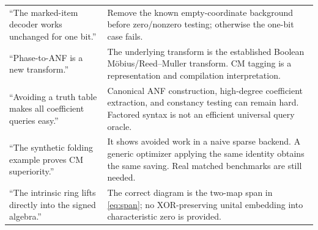 \documentclass[11pt,a4paper]{article}
\theoremstyle{definition}\newtheorem{definition}[theorem]{Definition}
\theoremstyle{remark}\newtheorem{remark}[theorem]{Remark}
\numberwithin{equation}{section}
\begin{document}
\begin{longtable}{@{}L{0.31\textwidth}L{0.63\textwidth}@{}}
``The marked-item decoder works unchanged for one bit.'' & Remove the known empty-coordinate background before zero/nonzero testing; otherwise the one-bit case fails.\\
``Phase-to-ANF is a new transform.'' & The underlying transform is the established Boolean M\"obius/Reed--Muller transform. CM tagging is a representation and compilation interpretation.\\
``Avoiding a truth table makes all coefficient queries easy.'' & Canonical ANF construction, high-degree coefficient extraction, and constancy testing can remain hard. Factored syntax is not an efficient universal query oracle.\\
``The synthetic folding example proves CM superiority.'' & It shows avoided work in a naive sparse backend. A generic optimizer applying the same identity obtains the same saving. Real matched benchmarks are still needed.\\
``The intrinsic ring lifts directly into the signed algebra.'' & The correct diagram is the two-map span in \cref{eq:span}; no XOR-preserving unital embedding into characteristic zero is provided.\\\bottomrule
\end{longtable}
\end{document}
